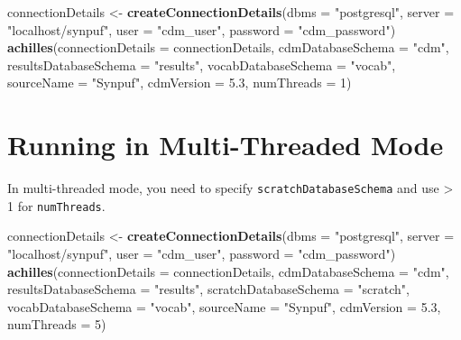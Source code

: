 \documentclass[
]{article}
\newenvironment{Shaded}{\begin{snugshade}}{\end{snugshade}}
\newcommand{\DataTypeTok}[1]{\textcolor[rgb]{0.13,0.29,0.53}{#1}}
\newcommand{\DecValTok}[1]{\textcolor[rgb]{0.00,0.00,0.81}{#1}}
\newcommand{\FloatTok}[1]{\textcolor[rgb]{0.00,0.00,0.81}{#1}}
\newcommand{\KeywordTok}[1]{\textcolor[rgb]{0.13,0.29,0.53}{\textbf{#1}}}
\newcommand{\NormalTok}[1]{#1}
\newcommand{\StringTok}[1]{\textcolor[rgb]{0.31,0.60,0.02}{#1}}
\begin{document}
\begin{Shaded}
\begin{Highlighting}[]
\NormalTok{connectionDetails <-}\StringTok{ }\KeywordTok{createConnectionDetails}\NormalTok{(}\DataTypeTok{dbms =} \StringTok{"postgresql"}\NormalTok{, }
                                             \DataTypeTok{server =} \StringTok{"localhost/synpuf"}\NormalTok{, }
                                             \DataTypeTok{user =} \StringTok{"cdm_user"}\NormalTok{, }
                                             \DataTypeTok{password =} \StringTok{"cdm_password"}\NormalTok{)}
\KeywordTok{achilles}\NormalTok{(}\DataTypeTok{connectionDetails =}\NormalTok{ connectionDetails, }
         \DataTypeTok{cdmDatabaseSchema =} \StringTok{"cdm"}\NormalTok{, }
         \DataTypeTok{resultsDatabaseSchema =} \StringTok{"results"}\NormalTok{, }
         \DataTypeTok{vocabDatabaseSchema =} \StringTok{"vocab"}\NormalTok{, }
         \DataTypeTok{sourceName =} \StringTok{"Synpuf"}\NormalTok{, }
         \DataTypeTok{cdmVersion =} \FloatTok{5.3}\NormalTok{, }
         \DataTypeTok{numThreads =} \DecValTok{1}\NormalTok{)}
\end{Highlighting}
\end{Shaded}

\hypertarget{running-in-multi-threaded-mode}{%
\section{Running in Multi-Threaded
Mode}\label{running-in-multi-threaded-mode}}

In multi-threaded mode, you need to specify
\texttt{scratchDatabaseSchema} and use \textgreater{} 1 for
\texttt{numThreads}.

\begin{Shaded}
\begin{Highlighting}[]
\NormalTok{connectionDetails <-}\StringTok{ }\KeywordTok{createConnectionDetails}\NormalTok{(}\DataTypeTok{dbms =} \StringTok{"postgresql"}\NormalTok{, }
                                             \DataTypeTok{server =} \StringTok{"localhost/synpuf"}\NormalTok{, }
                                             \DataTypeTok{user =} \StringTok{"cdm_user"}\NormalTok{, }
                                             \DataTypeTok{password =} \StringTok{"cdm_password"}\NormalTok{)}
\KeywordTok{achilles}\NormalTok{(}\DataTypeTok{connectionDetails =}\NormalTok{ connectionDetails, }
         \DataTypeTok{cdmDatabaseSchema =} \StringTok{"cdm"}\NormalTok{, }
         \DataTypeTok{resultsDatabaseSchema =} \StringTok{"results"}\NormalTok{, }
         \DataTypeTok{scratchDatabaseSchema =} \StringTok{"scratch"}\NormalTok{, }
         \DataTypeTok{vocabDatabaseSchema =} \StringTok{"vocab"}\NormalTok{, }
         \DataTypeTok{sourceName =} \StringTok{"Synpuf"}\NormalTok{, }
         \DataTypeTok{cdmVersion =} \FloatTok{5.3}\NormalTok{, }
         \DataTypeTok{numThreads =} \DecValTok{5}\NormalTok{)}
\end{Highlighting}
\end{Shaded}
\end{document}
